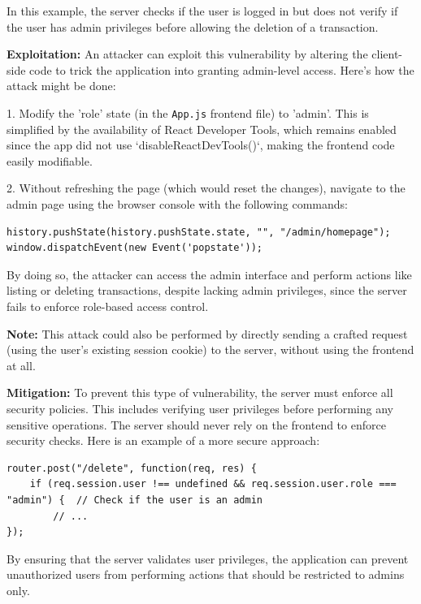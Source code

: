 \documentclass[]{article}
\begin{document}
In this example, the server checks if the user is logged in but does not verify if the user has admin privileges before allowing the deletion of a transaction.

\textbf{Exploitation:}  
An attacker can exploit this vulnerability by altering the client-side code to trick the application into granting admin-level access. Here's how the attack might be done:

1. Modify the 'role' state (in the \texttt{App.js} frontend file) to 'admin'. This is simplified by the availability of React Developer Tools, which remains enabled since the app did not use `disableReactDevTools()`, making the frontend code easily modifiable.
   
2. Without refreshing the page (which would reset the changes), navigate to the admin page using the browser console with the following commands:
\begin{lstlisting}
history.pushState(history.pushState.state, "", "/admin/homepage");
window.dispatchEvent(new Event('popstate'));
\end{lstlisting}

By doing so, the attacker can access the admin interface and perform actions like listing or deleting transactions, despite lacking admin privileges, since the server fails to enforce role-based access control. 

\textbf{Note:} This attack could also be performed by directly sending a crafted request (using the user's existing session cookie) to the server, without using the frontend at all.

\textbf{Mitigation:}
To prevent this type of vulnerability, the server must enforce all security policies. This includes verifying user privileges before performing any sensitive operations. The server should never rely on the frontend to enforce security checks. Here is an example of a more secure approach:

\begin{lstlisting}
router.post("/delete", function(req, res) {
    if (req.session.user !== undefined && req.session.user.role === "admin") {  // Check if the user is an admin
        // ...
});
\end{lstlisting}
By ensuring that the server validates user privileges, the application can prevent unauthorized users from performing actions that should be restricted to admins only.
\end{document}
